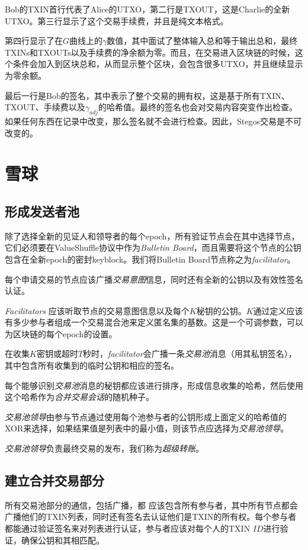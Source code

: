 \documentclass[8pt,fleqn,openany]{book}
\begin{document}
\begin{CJK*}{UTF8}{gbsn}
{Bob的TXIN首行代表了Alice的UTXO，第二行是TXOUT，这是Charlie的全新UTXO。第三行显示了这个交易手续费，并且是纯文本格式。

第四行显示了在$G$曲线上的$\gamma$数值，其中面试了整体输入总和等于输出总和，最终TXINs和TXOUTs以及手续费的净余额为零。而且，在交易进入区块链的时候，这个条件会加入到区块总和，从而显示整个区块，会包含很多UTXO，并且继续显示为零余额。

最后一行是Bob的签名，其中表示了整个交易的拥有权，这是基于所有TXIN、TXOUT、手续费以及$\gamma_{adj}$的哈希值。最终的签名也会对交易内容突变作出检查。如果任何东西在记录中改变，那么签名就不会进行检查。因此，Stegos交易是不可改变的。

\chapter{雪球}\label{app:snowball}

\section{形成发送者池}
除了选择全新的见证人和领导者的每个epoch，所有验证节点会在其中选择节点，它们必须要在ValueShuffle协议中作为\textit{Bulletin Board}，而且需要将这个节点的公钥包含在全新epoch的密封keyblock。我们将Bulletin Board节点称之为\textit{facilitator}。

每个申请交易的节点应该广播\textit{交易意图}信息，同时还有全新的公钥以及有效性签名认证。

\textit{Facilitators} 应该听取节点的交易意图信息以及每个$K$秘钥的公钥。$K$通过定义应该有多少参与者组成一个交易混合池来定义匿名集的基数。这是一个可调参数，可以为区块链的每个epoch的设置。

在收集$K$密钥或超时$T$秒时，\textit{facilitator}会广播一条\textit{交易池}消息（用其私钥签名），其中包含所有收集到的临时公钥和相应的签名。

每个能够识别\textit{交易池}消息的秘钥都应该进行排序，形成信息收集的哈希，然后使用这个哈希作为\textit{合并交易会话}的随机种子。

\textit{交易池领导}由参与节点通过使用每个池参与者的公钥形成上面定义的哈希值的XOR来选择，如果结果值是列表中的最小值，则该节点应选择为\textit{交易池领导}。

\textit{交易池领导}负责最终交易的发布，我们称为\textit{超级转账}。

\section{建立合并交易部分}
所有交易池部分的通信，包括广播，都 应该包含所有参与者，其中所有节点都会广播他们的TXIN列表，同时还有签名去认证他们是TXIN的所有权。每个参与者都能通过验证签名来对列表进行认证，参与者应该对每个人的TXIN $ID$进行验证，确保公钥和其相匹配。

}
\end{CJK*}
\end{document}
